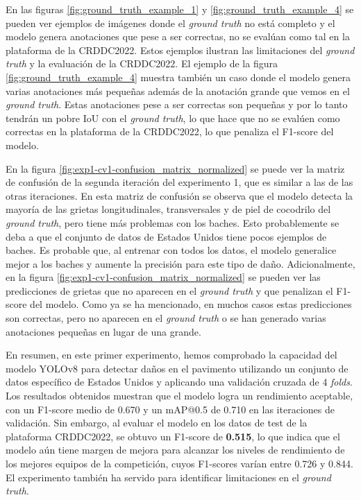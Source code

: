 En las figuras \ref{fig:ground_truth_example_1} y \ref{fig:ground_truth_example_4} se pueden ver ejemplos de imágenes donde el \textit{ground truth} no está completo y el modelo genera anotaciones que pese a ser correctas, no se evalúan como tal en la plataforma de la CRDDC2022. Estos ejemplos ilustran las limitaciones del \textit{ground truth} y la evaluación de la CRDDC2022. El ejemplo de la figura \ref{fig:ground_truth_example_4} muestra también un caso donde el modelo genera varias anotaciones más pequeñas además de la anotación grande que vemos en el \textit{ground truth}. Estas anotaciones pese a ser correctas son pequeñas y por lo tanto tendrán un pobre IoU con el \textit{ground truth}, lo que hace que no se evalúen como correctas en la plataforma de la CRDDC2022, lo que penaliza el F1-score del modelo.

En la figura \ref{fig:exp1-cv1-confusion_matrix_normalized} se puede ver la matriz de confusión de la segunda iteración del experimento 1, que es similar a las de las otras iteraciones. En esta matriz de confusión se observa que el modelo detecta la mayoría de las grietas longitudinales, transversales y de piel de cocodrilo del \textit{ground truth}, pero tiene más problemas con los baches. Esto probablemente se deba a que el conjunto de datos de Estados Unidos tiene pocos ejemplos de baches. Es probable que, al entrenar con todos los datos, el modelo generalice mejor a los baches y aumente la precisión para este tipo de daño. Adicionalmente, en la figura \ref{fig:exp1-cv1-confusion_matrix_normalized} se pueden ver las predicciones de grietas que no aparecen en el \textit{ground truth} y que penalizan el F1-score del modelo. Como ya se ha mencionado, en muchos casos estas predicciones son correctas, pero no aparecen en el \textit{ground truth} o se han generado varias anotaciones pequeñas en lugar de una grande.

En resumen, en este primer experimento, hemos comprobado la capacidad del modelo YOLOv8 para detectar daños en el pavimento utilizando un conjunto de datos específico de Estados Unidos y aplicando una validación cruzada de 4 \textit{folds}. Los resultados obtenidos muestran que el modelo logra un rendimiento aceptable, con un F1-score medio de 0.670 y un mAP@0.5 de 0.710 en las iteraciones de validación. Sin embargo, al evaluar el modelo en los datos de test de la plataforma CRDDC2022, se obtuvo un F1-score de \textbf{0.515}, lo que indica que el modelo aún tiene margen de mejora para alcanzar los niveles de rendimiento de los mejores equipos de la competición, cuyos F1-scores varían entre 0.726 y 0.844. El experimento también ha servido para identificar limitaciones en el \textit{ground truth}.

